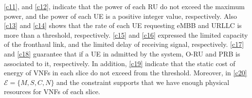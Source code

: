 \documentclass[conference]{IEEEtran}
\begin{document}
\eqref{c11}, and \eqref{c12}, indicate that the power of each RU do not exceed the maximum power, and the power of each UE is a positive integer value, respectively. 
Also \eqref{c13} and \eqref{c14} shows that the rate of each UE requesting eMBB and URLLC is more than a threshold, respectively.
\eqref{c15} and \eqref{c16} expressed the limited capacity of the fronthaul link, and the limited delay of receiving signal, respectively.
\eqref{c17} and \eqref{c18} guarantee that if a UE in admitted by the system, O-RU and PRB is associated to it, respectively.
In addition, \eqref{c19} indicate that the static cost of energy of VNFs in each slice do not exceed from the threshold. 
Moreover, in \eqref{c20}  $\mathcal{E} = \{M,S,C, N\}$ and the constraint supports
that we have enough physical resources for VNFs of each slice.




\end{document}
